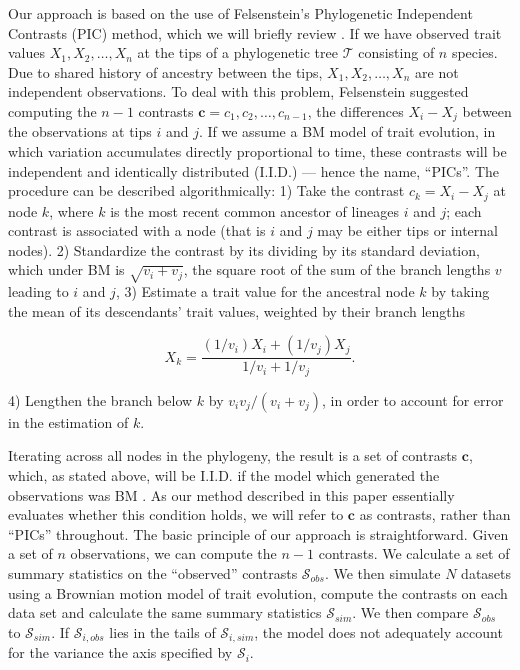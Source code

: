 \documentclass[a4paper,12pt]{article}
\begin{document}
Our approach is based on the use of Felsenstein's \citep{Felsenstein1973, Felsenstein1985} Phylogenetic Independent Contrasts (PIC) method, which we will briefly review \citep[for more details, see][]{Felsenstein1985, Rohlf2001, Blomberg2012}. If we have observed trait values $X_1, X_2, \ldots, X_n$ at the tips of a phylogenetic tree $\mathcal{T}$ consisting of $n$ species. Due to shared history of ancestry between the tips, $X_1, X_2, \ldots, X_n$ are not independent observations. To deal with this problem, Felsenstein suggested computing the $n-1$ contrasts $\mathbf{c} = c_1, c_2, \ldots, c_{n-1}$, the differences $X_{i} - X_{j}$ between the observations at tips $i$ and $j$. If we assume a BM model of trait evolution, in which variation accumulates directly proportional to time, these contrasts will be independent and identically distributed (I.I.D.) --- hence the name, ``PICs''. The procedure can be described algorithmically: 1) Take the contrast $c_k = X_i - X_j$ at node $k$, where $k$ is the most recent common ancestor of lineages $i$ and $j$; each contrast is associated with a node (that is $i$ and $j$ may be either tips or internal nodes). 2) Standardize the contrast by its dividing by its standard deviation, which under BM is $\sqrt{v_i + v_j}$, the square root of the sum of the branch lengths $v$ leading to $i$ and $j$, 3) Estimate a trait value for the ancestral node $k$ by taking the mean of its descendants' trait values, weighted by their branch lengths

\begin{equation}
X_k = \frac{(1 / v_i)X_i + (1 / v_j)X_j}{1/v_i + 1/v_j}.
\end{equation}

4) Lengthen the branch below $k$ by $v_i v_j / (v_i + v_j)$, in order to account for error in the estimation of $k$. 

Iterating across all nodes in the phylogeny, the result is a set of contrasts $\mathbf{c}$, which, as stated above, will be I.I.D. if the model which generated the observations was BM \citep{Felsenstein1985, Rohlf2001}. As our method described in this paper essentially evaluates whether this condition holds, we will refer to $\mathbf{c}$ as contrasts, rather than ``PICs'' throughout. The basic principle of our approach is straightforward. Given a set of $n$ observations, we can compute the $n-1$ contrasts. We calculate a set of summary statistics on the ``observed'' contrasts $\mathcal{S}_{obs}$. We then simulate $N$ datasets using a Brownian motion model of trait evolution, compute the contrasts on each data set and calculate the same summary statistics $\mathcal{S}_{sim}$. We then compare $\mathcal{S}_{obs}$ to $\mathcal{S}_{sim}$. If $\mathcal{S}_{i, obs}$ lies in the tails of $\mathcal{S}_{i, sim}$, the model does not adequately account for the variance the axis specified by $\mathcal{S}_i$.
\end{document}
